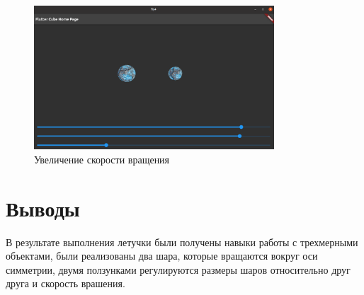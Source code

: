 \documentclass[a4paper, 14pt]{extarticle}
\begin{document}
\begin{figure}[!htb]
	\centering
	\includegraphics[width=0.8\textwidth]{img4}
\caption{Увеличение скорости вращения}
\label{fig:img4}
\end{figure}

\section{Выводы}\label{Sect::conclusion}

В результате выполнения летучки были получены навыки работы с трехмерными объектами, были реализованы два шара, которые вращаются вокруг оси симметрии, двумя ползунками регулируются размеры шаров относительно друг друга и скорость врашения.
\end{document}

